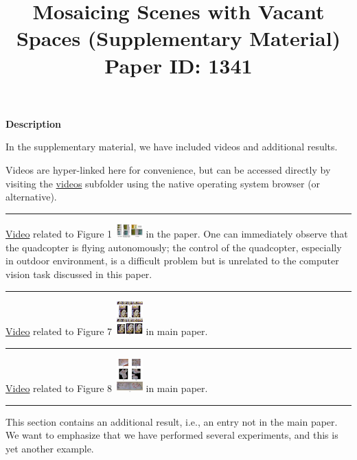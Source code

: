 \documentclass[10pt,twocolumn,letterpaper]{article}
\begin{document}
\title{Mosaicing Scenes with Vacant Spaces (Supplementary Material)  \\ Paper
ID: 1341 }

\maketitle
\setcounter{figure}{8}
\textbf{Description}

In the supplementary material, we have included videos and
additional results.

Videos are hyper-linked here for convenience, but can be accessed directly by
visiting the \href{videos}{videos} subfolder using the native operating system
browser (or alternative).
\hrule

\href{videos/teaser.avi}{Video} related to Figure
1~\includegraphics[width=1cm]{figures/teaserThumbail.png} in the paper.
One can immediately observe that the quadcopter is flying autonomously; the control of the quadcopter,
especially in outdoor environment, is a difficult problem but is unrelated to the computer vision task
discussed in this paper.

\hrule
\href{videos/lady1.avi} {Video} related to Figure
7~\includegraphics[width=1cm]{figures/lady1Thumbail.png} in main paper.

\hrule

\href{videos/greenRed.avi} {Video} related to Figure
8~\includegraphics[width=1cm]{figures/greenRedThumbail.png} in main paper.

\hrule
This section contains an additional result, i.e., an entry not in the main paper.  We want to emphasize that we have performed several experiments,
and this is yet another example.  
\end{document}
